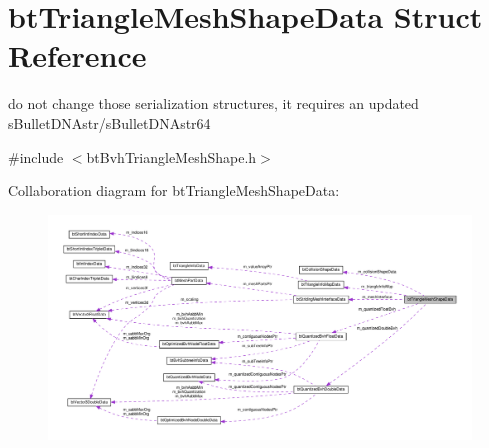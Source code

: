 \hypertarget{structbtTriangleMeshShapeData}{}\section{bt\+Triangle\+Mesh\+Shape\+Data Struct Reference}
\label{structbtTriangleMeshShapeData}


do not change those serialization structures, it requires an updated s\+Bullet\+D\+N\+Astr/s\+Bullet\+D\+N\+Astr64  




{\ttfamily \#include $<$bt\+Bvh\+Triangle\+Mesh\+Shape.\+h$>$}



Collaboration diagram for bt\+Triangle\+Mesh\+Shape\+Data\+:
\nopagebreak
\begin{figure}[H]
\begin{center}
\leavevmode
\includegraphics[width=350pt]{structbtTriangleMeshShapeData__coll__graph}
\end{center}
\end{figure}
